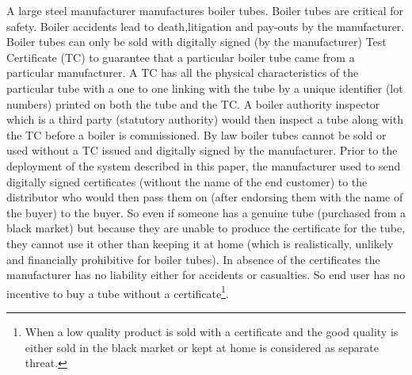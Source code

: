 \documentclass{article}
\begin{document}
A large steel manufacturer
manufactures boiler tubes. Boiler tubes are critical for safety. Boiler accidents lead to death,litigation and pay-outs by the manufacturer. Boiler tubes can only be sold with digitally signed (by the manufacturer) Test Certificate (TC) to guarantee that a particular boiler tube came from a particular manufacturer. 
A TC has all the physical characteristics of the particular tube with a one to one linking with the tube by a unique identifier (lot numbers) printed on both the tube and the TC. A boiler authority inspector which is a third party (statutory authority) would then inspect a tube along with the TC before a boiler is commissioned. 
By law boiler tubes cannot be sold or used without a TC issued and digitally signed by the manufacturer. Prior to the deployment of the system described in this paper, the manufacturer used to send digitally signed certificates (without the name of the end customer) to the distributor who would then pass them on (after endorsing them with the name of the buyer) to the buyer. So even if someone has a genuine tube (purchased from a black market) but because they are unable to produce the certificate for the tube, they cannot use it other than keeping it at home (which is realistically, unlikely and financially prohibitive for boiler tubes). In absence of the certificates the manufacturer has no liability either for accidents or casualties. So end user has no incentive to buy a tube without a certificate\footnote{When a low quality product is sold with a certificate and the good quality is either sold in the black market or kept at home is considered as separate threat.}.
\end{document}
